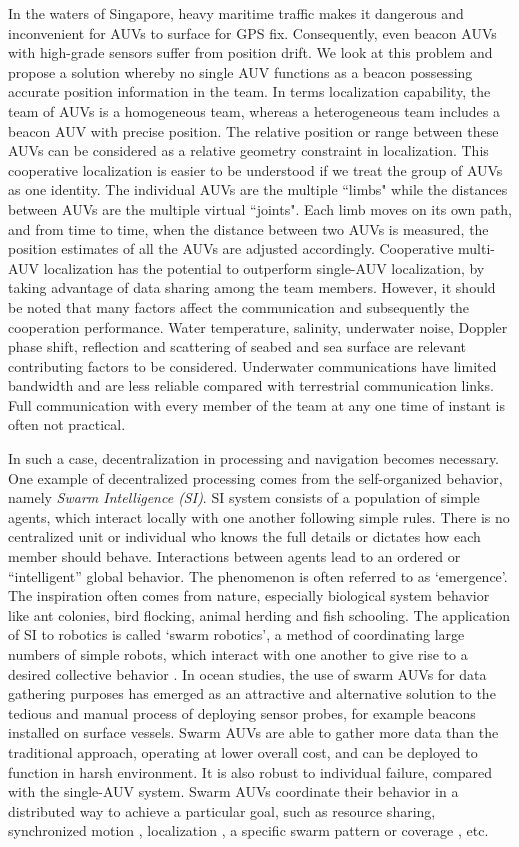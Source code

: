 In the waters of Singapore, heavy maritime traffic makes it dangerous and inconvenient for AUVs to surface for GPS fix. Consequently, even beacon AUVs with high-grade sensors suffer from position drift. We look at this problem and propose a solution whereby no single AUV functions as a beacon possessing accurate position information in the team. In terms localization capability, the team of AUVs is a homogeneous team, whereas a heterogeneous team includes a beacon AUV with precise position. The relative position or range between these AUVs can be considered as a relative geometry constraint in
localization. This cooperative localization is easier to be understood if we treat the group of AUVs as one identity. The individual AUVs are the multiple ``limbs" while the distances between AUVs are the multiple virtual ``joints". Each limb moves on its own path, and from time to time, when the distance between two AUVs is measured, the position estimates of all the AUVs are
adjusted accordingly. Cooperative multi-AUV localization has the potential to outperform single-AUV localization, by taking advantage of data sharing among the team members. However, it should be noted that many factors affect the communication and subsequently the cooperation performance. Water temperature, salinity, underwater noise, Doppler phase shift, reflection and scattering of seabed and sea surface are relevant contributing factors to be considered. Underwater communications have limited bandwidth and are less reliable compared with terrestrial communication links. Full
communication with every member of the team at any one time of instant is often not practical.

In such a case, decentralization in processing and navigation becomes necessary. One example of decentralized processing comes from the self-organized behavior, namely \textit{Swarm Intelligence (SI)}. SI system consists of a population of simple agents, which interact locally with one another following simple rules. There is no centralized unit or individual who knows the full details or dictates how each member should behave. Interactions between agents lead to an ordered or ``intelligent'' global behavior. The phenomenon is often referred to as `emergence'.  The inspiration often comes from nature, especially biological system behavior like ant colonies, bird flocking, animal herding and fish schooling. The application of
SI to robotics is called `swarm robotics', a method of coordinating large numbers of simple robots, which interact with one another to give rise to a desired collective behavior \cite{SI1,SI2,SI3}. In ocean studies, the use of swarm AUVs for data gathering purposes has emerged as an attractive and alternative solution to the tedious and manual process of deploying sensor probes, for example beacons installed on surface vessels. Swarm AUVs are able to gather more data than the traditional approach, operating at lower overall cost, and can be deployed to function in harsh environment. It is also robust to individual failure, compared with the single-AUV system. Swarm AUVs
coordinate their behavior in a distributed way to achieve a particular goal, such as resource sharing, synchronized motion \cite{Sam2005}, localization \cite{liu2014}, a specific swarm pattern or coverage \cite{Spires1998}, etc.


